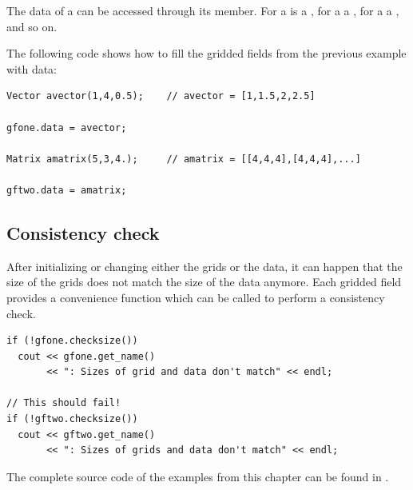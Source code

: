 The data of a  can be accessed through its  member.
For a   is a , for a  a , for a  a , and so on.

The following code shows how to fill the gridded fields from the previous example with data:

\begin{verbatim}
Vector avector(1,4,0.5);    // avector = [1,1.5,2,2.5]

gfone.data = avector;

Matrix amatrix(5,3,4.);     // amatrix = [[4,4,4],[4,4,4],...]

gftwo.data = amatrix;
\end{verbatim}

\subsection{Consistency check}
\label{sec:griddedfields:consistency}

After initializing or changing either the grids or the data, it can happen
that the size of the grids does not match the size of the data anymore. Each
gridded field provides a convenience function which can be called to perform a
consistency check.

\begin{verbatim}
if (!gfone.checksize())
  cout << gfone.get_name()
       << ": Sizes of grid and data don't match" << endl;

// This should fail!
if (!gftwo.checksize())
  cout << gftwo.get_name()
       << ": Sizes of grids and data don't match" << endl;
\end{verbatim}

The complete source code of the examples from this chapter can be found in
.


